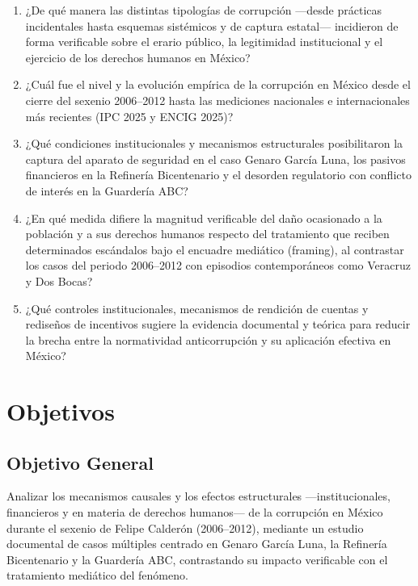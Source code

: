 \begin{enumerate}
  \item ¿De qué manera las distintas tipologías de corrupción ---desde prácticas incidentales hasta esquemas sistémicos y de captura estatal--- incidieron de forma verificable sobre el erario público, la legitimidad institucional y el ejercicio de los derechos humanos en México?
  
  \item ¿Cuál fue el nivel y la evolución empírica de la corrupción en México desde el cierre del sexenio 2006--2012 hasta las mediciones nacionales e internacionales más recientes (IPC 2025 y ENCIG 2025)?
  
  \item ¿Qué condiciones institucionales y mecanismos estructurales posibilitaron la captura del aparato de seguridad en el caso Genaro García Luna, los pasivos financieros en la Refinería Bicentenario y el desorden regulatorio con conflicto de interés en la Guardería ABC?
  
  \item ¿En qué medida difiere la magnitud verificable del daño ocasionado a la población y a sus derechos humanos respecto del tratamiento que reciben determinados escándalos bajo el encuadre mediático (framing), al contrastar los casos del periodo 2006--2012 con episodios contemporáneos como Veracruz y Dos Bocas?
  
  \item ¿Qué controles institucionales, mecanismos de rendición de cuentas y rediseños de incentivos sugiere la evidencia documental y teórica para reducir la brecha entre la normatividad anticorrupción y su aplicación efectiva en México?
\end{enumerate}

\section{Objetivos}

\subsection{Objetivo General}

Analizar los mecanismos causales y los efectos estructurales ---institucionales, financieros y en materia de derechos humanos--- de la corrupción en México durante el sexenio de Felipe Calderón (2006--2012), mediante un estudio documental de casos múltiples centrado en Genaro García Luna, la Refinería Bicentenario y la Guardería ABC, contrastando su impacto verificable con el tratamiento mediático del fenómeno.

